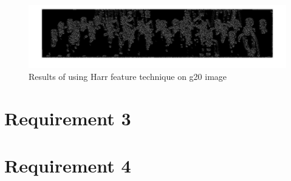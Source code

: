 \documentclass{article}
\begin{document}
\begin{figure}[H]
  \includegraphics[width=\linewidth]{harrfeat.jpg}
  \caption{Results of using Harr feature technique on g20 image}
  \label{fig:harrfeat}
\end{figure}

\section{Requirement 3}

\section{Requirement 4}




\end{document}
